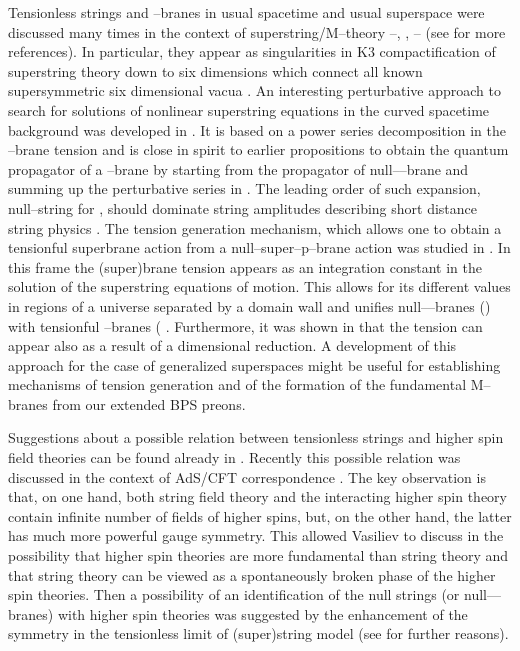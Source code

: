 \documentclass[a4paper,11pt]{article}
\begin{document}
Tensionless strings and \coordHE{}--branes in usual spacetime 
and usual superspace  
were discussed many times in the context of superstring/M--theory 
\cite{Shild}--\cite{Zh}, \cite{BZ}, \cite{Lindstrom2}--\cite{CEGK}
(see \cite{BZ,Bozhilov1} for more references). In particular, 
they appear as singularities in K3 compactification of superstring theory 
down  to six dimensions which connect all known supersymmetric six 
dimensional vacua \cite{Witten}. 
An interesting perturbative approach to  search for solutions  
of nonlinear superstring equations in the curved spacetime background 
was developed in \cite{Zh}. It is based on a power series decomposition 
in the \coordHE{}--brane tension  \coordHE{} and 
is close in spirit to earlier propositions \cite{Isham} 
to obtain the quantum propagator of a \coordHE{}--brane by starting from the 
propagator 
of null--\coordHE{}--brane and summing up the perturbative series in \coordHE{}. 
The leading order of such expansion, null--string for \coordHE{}, 
should dominate string amplitudes describing short distance string  physics 
\cite{Gross}.  
The tension generation mechanism, which allows one to obtain 
a tensionful superbrane action from a null--super--p--brane action 
was studied in \cite{ten-gen,ten-gen1}. In this frame 
the (super)brane tension \coordHE{} appears as an integration 
constant in the solution of the superstring equations of motion. 
This allows for its different values in  regions of a  
universe separated by a domain wall and unifies null--\coordHE{}--branes 
(\coordHE{}) with tensionful \coordHE{}--branes (\coordHE{} . 
Furthermore, it was shown in \cite{ten-gen1} that the tension 
\coordHE{} can appear also as a result of a dimensional reduction. 
A development of this approach for the case of generalized superspaces 
might be useful for establishing mechanisms of tension generation and 
of the formation of the fundamental M--branes from our extended BPS preons. 


Suggestions about a possible relation between tensionless strings and 
higher spin field theories can be found already in 
\cite{Vasiliev89}. Recently this possible relation was discussed 
in the context of AdS/CFT correspondence \cite{Sundborg}. The key 
observation is that, on one hand, both string field theory 
and the interacting higher spin theory contain infinite number 
of fields of higher spins, but, on the other hand,  
the latter has much more powerful gauge symmetry. This allowed Vasiliev to 
discuss in \cite{Vasiliev89} the possibility  
that higher spin theories are more 
fundamental than string theory and that  string theory can be viewed 
as a spontaneously broken phase of the higher spin theories. 
Then a possibility of an identification of 
the null strings (or null--\coordHE{}--branes) 
with higher spin theories was suggested by the enhancement of the symmetry 
in the tensionless limit of (super)string model 
(see \cite{Sundborg} for further reasons). 
\end{document}
